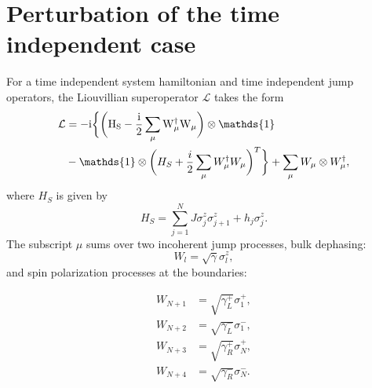 \documentclass[10pt]{article}
\numberwithin{equation}{section}
\begin{document}
\section{Perturbation of the time independent case}
For a time independent system hamiltonian and time independent jump operators, the Liouvillian superoperator $\mathcal{L}$ takes the form
\begin{equation} \label{eq:31}
\begin{aligned}
\mathcal{L} &= \rm -i\bigg\{\bigg(H_{S}-\frac{i}{2}\sum_{\mu}W_{\mu}^{\dagger}W_{\mu}\bigg)\otimes\mathds{1} \\ 
&-\mathds{1}\otimes\bigg(H_{S}+\frac{i}{2}\sum_{\mu}W_{\mu}^{\dagger}W_{\mu}\bigg)^{T}\bigg\} + \sum_{\mu}W_{\mu}\otimes W_{\mu}^{\dagger},
\end{aligned}
\end{equation} 
where $H_{S}$ is given by 
\begin{equation}
H_{S} = \sum_{j=1}^N J\sigma_{j}^{z}\sigma_{j+1}^{z} + h_{j}\sigma_{j}^{z}.
\end{equation}
The subscript $\mu$ sums over two incoherent jump processes, bulk dephasing:
\begin{equation}
W_{l} = \sqrt{\gamma}\sigma_{l}^{z},
\end{equation}
and spin polarization processes at the boundaries:

\begin{align*} 
W_{N+1} &= \sqrt{\gamma_{L}^{+}}\sigma_{1}^{+}, \\
W_{N+2} &= \sqrt{\gamma_{L}^{-}}\sigma_{1}^{-}, \\
W_{N+3} &= \sqrt{\gamma_{R}^{+}}\sigma_N^{+}, \\
W_{N+4} &= \sqrt{\gamma_{R}^{-}}\sigma_N^{-}.
\end{align*}
\end{document}
